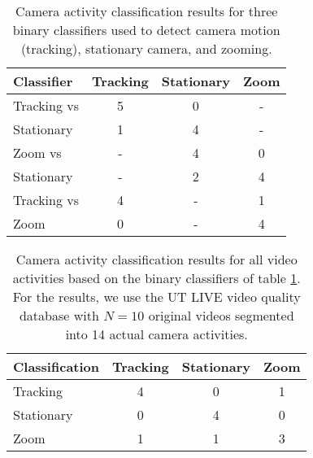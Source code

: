 \documentclass{book}
\begin{document}
\begin{table}[bt!]
	\centering
	\caption{\label{tbl:classify} 
		Camera activity classification results for three binary classifiers used
		to detect camera motion (tracking), stationary camera,
		and zooming.
	}
	\begin{tabular}{lccc }
		{\bf Classifier} & Tracking & Stationary & Zoom \\
		\hline
		\hline
		Tracking  vs   & 5 & 0 & - \\
		Stationary & 1 & 4 & - \\
		\hline
		Zoom vs    & - & 4 & 0 \\
		Stationary  & - & 2 & 4  \\
		\hline
		Tracking vs & 4 & - & 1 \\
		Zoom     & 0 & - & 4  \\
		\hline
	\end{tabular}
\end{table}


\begin{table}[bt!]
	\centering
	\caption{\label{tbl:full} 
		Camera activity classification results for all video activities based
		on the binary classifiers of table \ref{tbl:classify}.
		For the results, we use the UT LIVE video quality database \cite{Kalpana}
		with $N=10$ original videos segmented into 14 actual camera activities.
	}
	\begin{tabular}{lccc }
		{\bf Classification} & Tracking & Stationary & Zoom \\
		\hline
		\hline
		Tracking                 & 4             &  0 &  1 \\
		Stationary               & 0             &  4 &  0 \\
		Zoom                      & 1             &  1 &  3 \\
		\hline
	\end{tabular}
\end{table}

	
	
\end{document}

